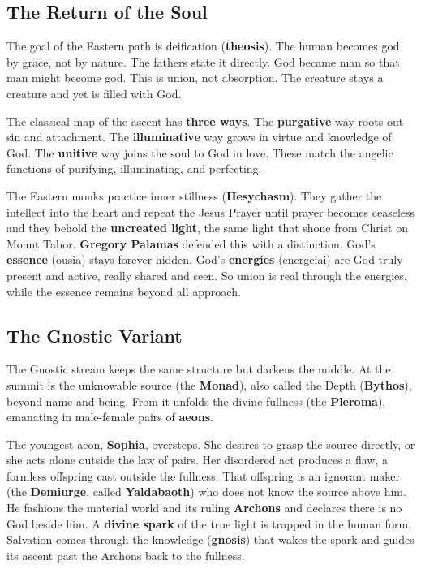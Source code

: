 \subsection{The Return of the Soul}

The goal of the Eastern path is deification (\textbf{theosis}). The human becomes
god by grace, not by nature. The fathers state it directly. God became man so
that man might become god. This is union, not absorption. The creature stays a
creature and yet is filled with God.

The classical map of the ascent has \textbf{three ways}. The
\textbf{purgative} way roots out sin and attachment. The \textbf{illuminative}
way grows in virtue and knowledge of God. The \textbf{unitive} way joins the
soul to God in love. These match the angelic functions of purifying,
illuminating, and perfecting.

The Eastern monks practice inner stillness (\textbf{Hesychasm}). They gather the
intellect into the heart and repeat the Jesus Prayer until prayer becomes
ceaseless and they behold the \textbf{uncreated light}, the same light that
shone from Christ on Mount Tabor. \textbf{Gregory Palamas} defended this with a
distinction. God's \textbf{essence} (ousia) stays forever hidden. God's
\textbf{energies} (energeiai) are God truly present and active, really shared
and seen. So union is real through the energies, while the essence remains
beyond all approach.

\subsection{The Gnostic Variant}

The Gnostic stream keeps the same structure but darkens the middle. At the
summit is the unknowable source (the \textbf{Monad}), also called the Depth
(\textbf{Bythos}), beyond name and being. From it unfolds the divine fullness
(the \textbf{Pleroma}), emanating in male-female pairs of \textbf{aeons}.

The youngest aeon, \textbf{Sophia}, oversteps. She desires to grasp the source
directly, or she acts alone outside the law of pairs. Her disordered act
produces a flaw, a formless offspring cast outside the fullness. That offspring
is an ignorant maker (the \textbf{Demiurge}, called \textbf{Yaldabaoth}) who does
not know the source above him. He fashions the material world and its ruling
\textbf{Archons} and declares there is no God beside him. A \textbf{divine
spark} of the true light is trapped in the human form. Salvation comes through
the knowledge (\textbf{gnosis}) that wakes the spark and guides its ascent past
the Archons back to the fullness.


